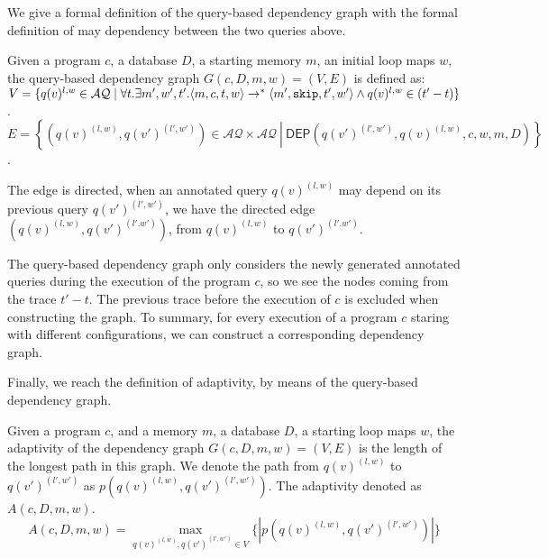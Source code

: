 %
We give a formal definition of the query-based dependency graph with the formal definition of may dependency between the two queries above.  
\begin{defn}
Given a program $c$, a database $D$, a starting memory $m$, an initial loop maps $w$, the query-based dependency graph $G(c,D,m,w) = (V, E)$ is defined as: \\
$V =\{q(v)^{l,w} \in \mathcal{AQ} \mid \forall t. \exists m',  w', t'.  \langle m ,c, t, w \rangle  \to^{*}  \langle m' , \mathtt{skip}, t', w'  \rangle  \land q(v)^{l,w} \in {(t'-t)}  \}$.
\\
$E = \left\{(q(v)^{(l,w)},q(v')^{(l',w')}) \in \mathcal{AQ} \times \mathcal{AQ} 
~ \left \vert ~ \mathsf{DEP}(q(v')^{(l',w')},q(v)^{(l,w)}, c,w,m,D)
 \right.\right\}$.
\end{defn}
%
The edge is directed, when an annotated query $q(v)^{(l,w)}$ may depend on its previous query $q(v')^{(l',w')}$, we have the directed
edge $(q(v)^{(l,w)}, q(v')^{(l'.w')})$, from $q(v)^{(l,w)} $ to $q(v')^{(l'.w')}$.

The query-based dependency graph only considers the newly generated annotated queries during the execution of the program $c$, so we see the nodes coming from the trace $t'-t$. The previous trace before the execution of $c$ is excluded when constructing the graph. To summary, for every execution of a program $c$ staring with different configurations, we can construct a corresponding dependency graph. 

Finally, we reach the definition of adaptivity, by means of the query-based dependency graph. 

\begin{defn}
Given a program $c$, and a memory $m$, a database $D$, a starting loop maps $w$, the adaptivity of the dependency graph $G(c, D,m,w) = (V, E)$ is the length of the longest path in this graph. We denote the path from $q(v)^{(l,w)}$ to $q(v')^{(l',w')}$ as $p(q(v)^{(l,w)}, q(v')^{(l',w')} )$. The adaptivity denoted as $A(c, D, m, w)$.
%
$$A(c, D, m, w) = \max\limits_{q(v)^{(l,w)},q(v')^{(l',w')} \in V }\{ |p(q(v)^{(l,w)}, q(v')^{(l',w')} )| \}$$
\end{defn}

